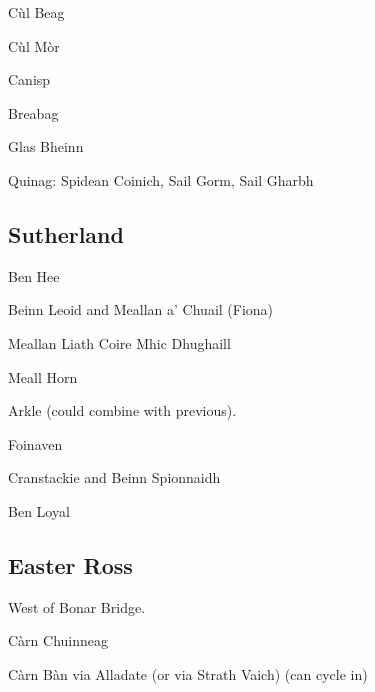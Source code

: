 Cùl Beag

Cùl Mòr

Canisp

Breabag


Glas Bheinn

Quinag: Spidean Coinich, Sail Gorm, Sail Gharbh


\subsection{Sutherland}

Ben Hee

Beinn Leoid and Meallan a' Chuail (Fiona)

Meallan Liath Coire Mhic Dhughaill

Meall Horn

Arkle (could combine with previous).

Foinaven

Cranstackie and Beinn Spionnaidh

Ben Loyal


\subsection{Easter Ross}

West of Bonar Bridge.

Càrn Chuinneag

Càrn Bàn via Alladate (or via Strath Vaich) (can cycle in)
